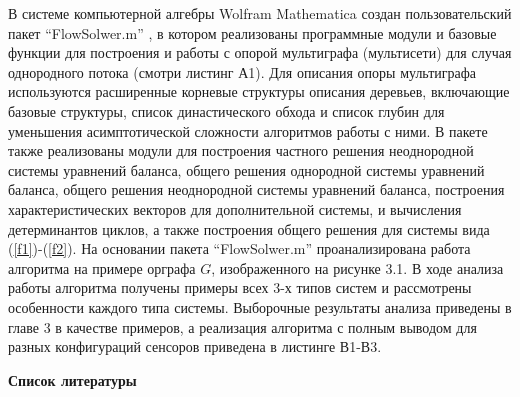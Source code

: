 \documentclass[14pt]{extarticle}%
\begin{document}
В системе компьютерной алгебры Wolfram Mathematica создан пользовательский пакет ``FlowSolwer.m'' , в котором реализованы программные модули и базовые функции для построения и работы с опорой мультиграфа (мультисети) для случая однородного потока (смотри листинг А1). Для описания опоры мультиграфа используются расширенные корневые структуры описания деревьев, включающие базовые структуры, список династического обхода и список глубин для уменьшения асимптотической сложности алгоритмов работы с ними. В пакете также реализованы модули для построения частного решения неоднородной системы уравнений баланса, общего решения однородной системы уравнений баланса, общего решения неоднородной системы уравнений баланса, построения характеристических векторов для дополнительной системы, и вычисления детерминантов циклов, а также построения общего решения для системы вида (\ref{f1})-(\ref{f2}). На основании пакета ``FlowSolwer.m'' проанализирована работа алгоритма на примере орграфа $G$, изображенного на рисунке 3.1. В ходе анализа работы алгоритма получены примеры всех 3-х типов систем и рассмотрены особенности каждого типа системы. Выборочные результаты анализа приведены в главе 3 в качестве примеров, а реализация алгоритма с полным выводом для разных конфигураций сенсоров приведена в листинге В1-В3.
\newpage
\begin{center}
    \textbf{Список литературы}
\end{center}
\end{document}
